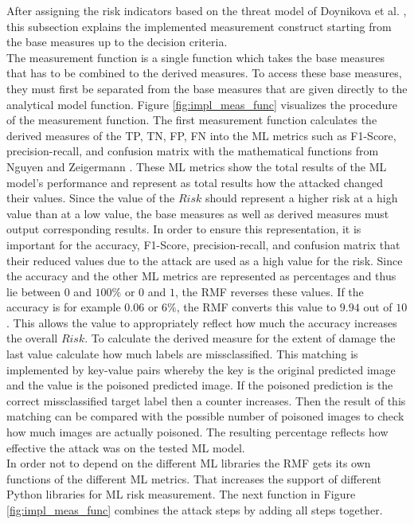 After assigning the risk indicators based on the threat model of Doynikova et al. \cite{DBLP:conf/crisis/DoynikovaNGK20}, this subsection explains the implemented measurement construct starting from the base measures up to the decision criteria. \\
The measurement function is a single function which takes the base measures that has to be combined to the derived measures. To access these base measures, they must first be separated from the base measures that are given directly to the analytical model function. Figure \ref{fig:impl_meas_func} visualizes the procedure of the measurement function. The first measurement function calculates the derived measures of the TP, TN, FP, FN into the ML metrics such as F1-Score, precision-recall, and confusion matrix with the mathematical functions from Nguyen and Zeigermann \cite{9783960101925}. These ML metrics show the total results of the ML model's performance and represent as total results how the attacked changed their values.
Since the value of the $Risk$ should represent a higher risk at a high value than at a low value, the base measures as well as derived measures must output corresponding results. In order to ensure this representation, it is important for the accuracy, F1-Score, precision-recall, and confusion matrix that their reduced values due to the attack are used as a high value for the risk. Since the accuracy and the other ML metrics are represented as percentages and thus lie between $0$ and $100\%$ or $0$ and $1$, the RMF reverses these values. If the accuracy
is for example $0.06$ or $6\%$, the RMF converts this value to $9.94$ out of $10$. This allows the value to appropriately reflect how much the accuracy increases the overall $Risk$. To calculate the derived measure for the extent of damage the last value calculate how much labels are missclassified. This matching is implemented by key-value pairs whereby the key is the original predicted image and the value is the poisoned predicted image. If the poisoned prediction is the correct missclassified target label then a counter increases. Then the result of this matching can be compared with the possible number of poisoned images to check how much images are actually poisoned. The resulting percentage reflects how effective the attack was on the tested ML model. \\
In order not to depend on the different ML libraries the RMF gets its own functions of the different ML metrics. That increases the support of different Python libraries for ML risk measurement. The next function in Figure \ref{fig:impl_meas_func} combines the attack steps by adding all steps together.

